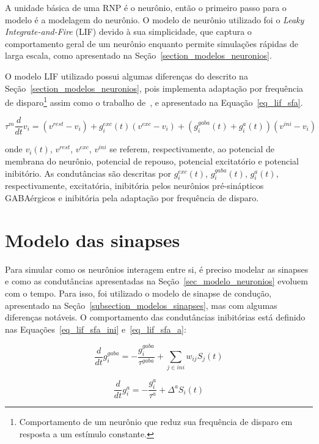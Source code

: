 A unidade básica de uma RNP é o neurônio, então o primeiro passo para o modelo é a modelagem do neurônio. O modelo de neurônio
utilizado foi o \textit{Leaky Integrate-and-Fire} (LIF) devido à sua simplicidade, que captura o comportamento geral de um
neurônio enquanto permite simulações rápidas de larga escala, como apresentado na Seção~\ref{section_modelos_neuronios}.

O modelo LIF utilizado possui algumas diferenças do descrito na Seção~\ref{section_modelos_neuronios}, pois implementa adaptação
por frequência de disparo\footnote{Comportamento de um neurônio que reduz sua frequência de disparo em resposta a um estímulo
constante.} assim como o trabalho de~\cite{zenkeDiverse2015}, e apresentado na Equação~\ref{eq_lif_sfa}.

\begin{equation}
\label{eq_lif_sfa}
\tau^m\frac{d}{dt}v_i = (v^{rest} - v_i) + g_i^{exc}(t)(v^{exc} - v_i)+ (g_i^{gaba}(t) + g_i^{a}(t))(v^{ini} - v_i)
\end{equation}

\noindent{}onde $v_i(t)$, $v^{rest}$, $v^{exc}$, $v^{ini}$ se referem, respectivamente, ao potencial de membrana do neurônio,
potencial de repouso, potencial excitatório e potencial inibitório. As condutâncias são descritas por $g_i^{exc}(t)$,
$g_i^{gaba}(t)$, $g_i^{a}(t)$, respectivamente, excitatória, inibitória pelos neurônios pré-sinápticos GABAérgicos e inibitória
pela adaptação por frequência de disparo.

\section{Modelo das sinapses}\label{sec_modelo_sinapses}

Para simular como os neurônios interagem entre si, é preciso modelar as sinapses e como as condutâncias apresentadas na
Seção~\ref{sec_modelo_neuronios} evoluem com o tempo. Para isso, foi utilizado o modelo de sinapse de condução, apresentado na
Seção~\ref{subsection_modelos_sinapses}, mas com algumas diferenças notáveis. O comportamento das condutâncias inibitórias está
definido nas Equações~\ref{eq_lif_sfa_ini} e~\ref{eq_lif_sfa_a}:

\begin{equation}
\label{eq_lif_sfa_ini}
\frac{d}{dt}g_i^{gaba} = -\frac{g_i^{gaba}}{\tau^{gaba}} + \sum_{j\in ini}{w_{ij}S_j(t)}
\end{equation}

\begin{equation}
\label{eq_lif_sfa_a}
\frac{d}{dt}g_i^{a} = -\frac{g_i^{a}}{\tau^{a}} + \Delta^{a}S_i(t)
\end{equation}

